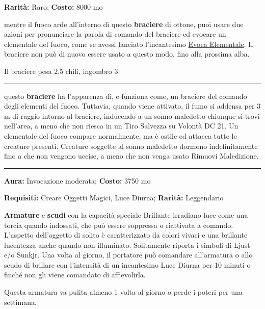 \begin{multicols}{2}
\textbf{Rarità:} Raro; \textbf{Costo:} 8000 mo

mentre il fuoco arde all'interno di questo \textbf{braciere} di ottone, puoi usare due azioni per pronunciare la parola di comando del braciere ed evocare un elementale del fuoco, come se avessi lanciato l'incantesimo \hyperlink{Evoca Elementale}{Evoca Elementale}. Il braciere non può di nuovo essere usato a questo modo, fino alla prossima alba.

Il braciere pesa 2,5 chili, ingombro 3.

\smallskip\noindent\rule{\linewidth}{2pt}  \hypertarget{BracieredelSonnomaledetto}{}\smallskip{}\noindent\label{BracieredelSonnomaledetto}

questo \textbf{braciere} ha l'apparenza di, e funziona come, un braciere del comando degli elementi del fuoco. Tuttavia, quando viene attivato, il fumo si addensa per 3 m di raggio intorno al braciere, inducendo a un sonno maledetto chiunque si trovi nell'area, a meno che non riesca in un Tiro Salvezza su Volontà DC 21. Un elementale del fuoco compare normalmente, ma è ostile ed attacca tutte le creature presenti. Creature soggette al sonno maledetto dormono indefinitamente fino a che non vengono uccise, a meno che non venga usato Rimuovi Maledizione.

\smallskip\noindent\rule{\linewidth}{2pt}  \hypertarget{Brillante}{}\smallskip{}\noindent\label{Brillante}

\textbf{Aura:} Invocazione moderata; \textbf{Costo:} 3750 mo

\textbf{Requisiti:} Creare Oggetti Magici, Luce Diurna; \textbf{Rarità:} Leggendario

\textbf{Armature} e \textbf{scudi} con la capacità speciale Brillante irradiano luce come una torcia quando indossati, che può essere soppressa o riattivata a comando. L'aspetto dell'oggetto di solito è caratterizzato da colori vivaci e una brillante lucentezza anche quando non illuminato. Solitamente riporta i simboli di Ljust e/o Sunkjr. Una volta al giorno, il portatore può comandare all'armatura o allo scudo di brillare con l'intensità di un incantesimo Luce Diurna per 10 minuti o finché non gli viene comandato di affievolirla.

Questa armatura va pulita almeno 1 volta al giorno o perde i poteri per una settimana.


\end{multicols}
